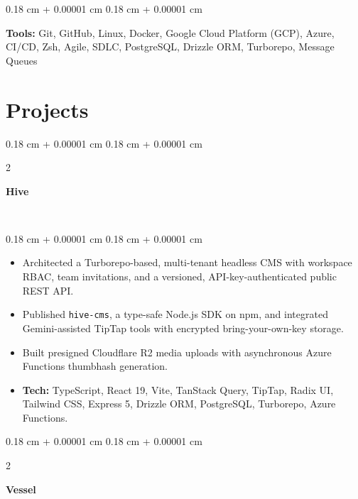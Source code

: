 \documentclass[10pt, letterpaper]{article}
\newenvironment{highlights}{
    \begin{itemize}[
        topsep=0.09 cm,
        parsep=0.09 cm,
        partopsep=0pt,
        itemsep=0pt,
        leftmargin=0.4 cm + 10pt
    ]
}{
    \end{itemize}
} %
\newenvironment{onecolentry}{
    \begin{adjustwidth}{
        0.18 cm + 0.00001 cm
    }{
        0.18 cm + 0.00001 cm
    }
}{
    \end{adjustwidth}
} %
\newenvironment{twocolentry}[2][]{
    \onecolentry
    \def\secondColumn{#2}
    \setcolumnwidth{\fill, 4.5 cm}
    \begin{paracol}{2}
}{
    \switchcolumn \raggedleft \secondColumn
    \end{paracol}
    \endonecolentry
} %
\let\hrefWithoutArrow\href
\renewcommand{\href}[2]{\hrefWithoutArrow{#1}{\ifthenelse{\equal{#2}{}}{ }{#2 }\raisebox{.15ex}{\footnotesize \faExternalLink*}}}
\begin{document}
        \vspace{0.05 cm}

        \begin{onecolentry}
            \textbf{Tools:} Git, GitHub, Linux, Docker, Google Cloud Platform (GCP), Azure, CI/CD, Zsh, Agile, SDLC, PostgreSQL, Drizzle ORM, Turborepo, Message Queues
        \end{onecolentry}

\section{Projects}

\begin{twocolentry}{
\href{https://hivecms.online}{\faGlobe} \ \href{https://github.com/ni3rav/hive}{\faGithub}
}
    \textbf{Hive}
\end{twocolentry}

\vspace{0.02 cm}
\begin{onecolentry}
    \begin{highlights}
        \item Architected a Turborepo-based, multi-tenant headless CMS with workspace RBAC, team invitations, and a versioned, API-key-authenticated public REST API.
        \item Published \texttt{hive-cms}, a type-safe Node.js SDK on npm, and integrated Gemini-assisted TipTap tools with encrypted bring-your-own-key storage.
        \item Built presigned Cloudflare R2 media uploads with asynchronous Azure Functions thumbhash generation.
        \item \textbf{Tech:} TypeScript, React 19, Vite, TanStack Query, TipTap, Radix UI, Tailwind CSS, Express 5, Drizzle ORM, PostgreSQL, Turborepo, Azure Functions.
    \end{highlights}
\end{onecolentry}

\vspace{0.05 cm}

\begin{twocolentry}{
\href{https://vessel-web-kappa.vercel.app/}{\faGlobe} \ \href{https://github.com/ni3rav/vessel}{\faGithub}
}
    \textbf{Vessel}
\end{twocolentry}
\end{document}
